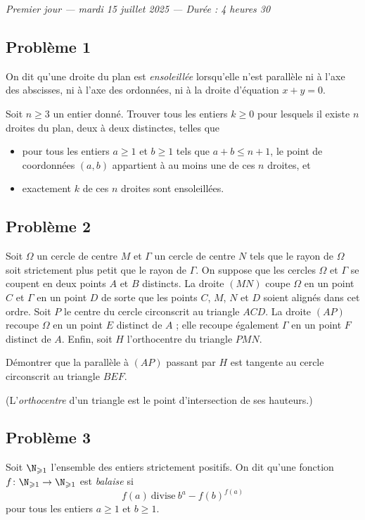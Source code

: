 
\begin{center}
  \emph{Premier jour --- mardi 15 juillet 2025 --- Durée : 4 heures 30}
\end{center}

\subsection*{Problème 1}
On dit qu'une droite du plan est \emph{ensoleillée} lorsqu'elle n'est
parallèle ni à l'axe des abscisses, ni à l'axe des ordonnées, ni à la
droite d'équation $x + y = 0$.

Soit $n \geqslant 3$ un entier donné. Trouver tous les entiers
$k \geqslant 0$ pour lesquels il existe $n$ droites du plan, deux à
deux distinctes, telles que
\begin{itemize}
  \item pour tous les entiers $a \geqslant 1$ et $b \geqslant 1$ tels
  que $a + b \leqslant n + 1$, le point de coordonnées $(a, b)$
  appartient à au moins une de ces $n$ droites, et
  \item exactement $k$ de ces $n$ droites sont ensoleillées.
\end{itemize}

\subsection*{Problème 2}
Soit $\Omega$ un cercle de centre $M$ et $\Gamma$ un cercle de centre
$N$ tels que le rayon de $\Omega$ soit strictement plus petit que le
rayon de $\Gamma$. On suppose que les cercles $\Omega$ et $\Gamma$ se
coupent en deux points $A$ et $B$ distincts. La droite $(MN)$ coupe
$\Omega$ en un point $C$ et $\Gamma$ en un point $D$ de sorte que les
points $C$, $M$, $N$ et $D$ soient alignés dans cet ordre. Soit $P$ le
centre du cercle circonscrit au triangle $ACD$. La droite $(AP)$
recoupe $\Omega$ en un point $E$ distinct de $A$ ; elle recoupe
également $\Gamma$ en un point $F$ distinct de $A$. Enfin, soit $H$
l'orthocentre du triangle $PMN$.

Démontrer que la parallèle à $(AP)$ passant par $H$ est tangente au
cercle circonscrit au triangle $BEF$.

(L'\emph{orthocentre} d'un triangle est le point d'intersection de ses
hauteurs.)

\subsection*{Problème 3}
Soit $\N_{\geqslant 1}$ l'ensemble des entiers strictement positifs.
On dit qu'une fonction $f \colon \N_{\geqslant 1} \to \N_{\geqslant 1}$
est \emph{balaise} si
\[
f(a) \ \text{divise} \ b^a - f(b)^{f(a)}
\]
pour tous les entiers $a \geqslant 1$ et $b \geqslant 1$.

